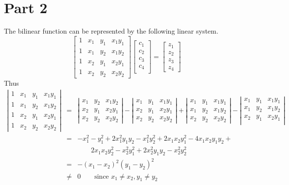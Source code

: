 \documentclass[11pt]{article}
\theoremstyle{definition}
\theoremstyle{remark}
\theoremstyle{plain}
\begin{document}
\section*{Part 2}
The bilinear function can be represented by the following linear system.
\begin{equation*}
  \left[
    \begin{array}{cccc}
      1&x_1&y_1&x_1y_1\\
      1&x_1&y_2&x_1y_2\\
      1&x_2&y_1&x_2y_1\\
      1&x_2&y_2&x_2y_2
    \end{array}\right]
  \left[
    \begin{array}{c}
      c_1\\
      c_2\\
      c_3\\
      c_4\\
    \end{array}\right]
  =
  \left[\begin{array}{c}
    z_1\\
    z_2\\
    z_3\\
    z_4
  \end{array}\right]
\end{equation*}
Thus
\begin{eqnarray*}
  \left|
  \begin{array}{cccc}
    1&x_1&y_1&x_1y_1\\
    1&x_1&y_2&x_1y_2\\
    1&x_2&y_1&x_2y_1\\
    1&x_2&y_2&x_2y_2
  \end{array}\right|&=&\left|
  \begin{array}{cccc}
    x_1&y_2&x_1y_2\\
    x_2&y_1&x_2y_1\\
    x_2&y_2&x_2y_2
  \end{array}\right|-\left|
  \begin{array}{cccc}
    x_1&y_1&x_1y_1\\
    x_2&y_1&x_2y_1\\
    x_2&y_2&x_2y_2
  \end{array}\right|+\left|
  \begin{array}{cccc}
    x_1&y_1&x_1y_1\\
    x_1&y_2&x_1y_2\\
    x_2&y_2&x_2y_2
  \end{array}\right|-\left|
  \begin{array}{cccc}
    x_1&y_1&x_1y_1\\
    x_1&y_2&x_1y_2\\
    x_2&y_1&x_2y_1\\
  \end{array}\right|\\
     &=&-x_1^2 -y_1^2+2 x_1^2 y_1 y_2-x_1^2y_2^2+2 x_1 x_2 y_1^2-4 x_1 x_2 y_1y_2+\\
     &&\qquad 2 x_1 x_2 y_2^2-x_2^2 y_1^2+2 x_2^2 y_1 y_2-x_2^2 y_2^2\\
     &=&-\left(x_1-x_2\right)^2\left(y_1-y_2\right)^2\\
     &\neq&0\qquad \textrm{since } x_1\neq x_2,y_1\neq y_2
\end{eqnarray*}
\end{document}
